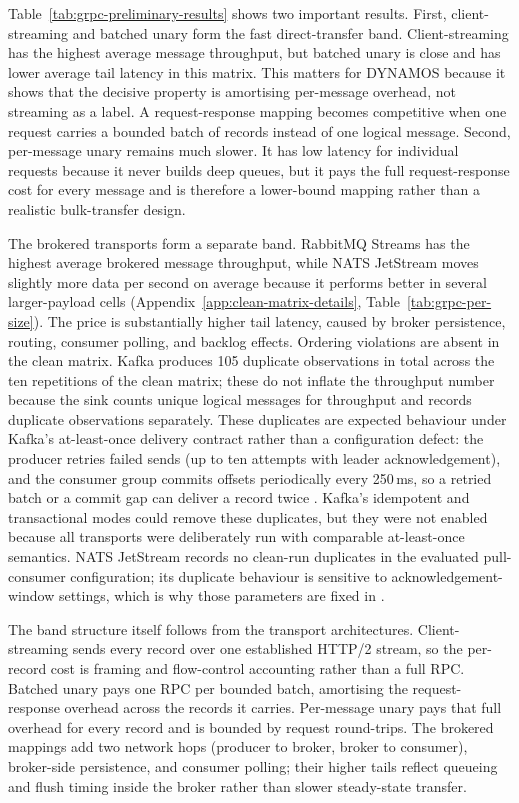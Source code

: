 Table~\ref{tab:grpc-preliminary-results} shows two important results. First, client-streaming and batched unary form the fast direct-transfer band. Client-streaming has the highest average message throughput, but batched unary is close and has lower average tail latency in this matrix. This matters for DYNAMOS because it shows that the decisive property is amortising per-message overhead, not streaming as a label. A request-response mapping becomes competitive when one request carries a bounded batch of records instead of one logical message. Second, per-message unary remains much slower. It has low latency for individual requests because it never builds deep queues, but it pays the full request-response cost for every message and is therefore a lower-bound mapping rather than a realistic bulk-transfer design.

The brokered transports form a separate band. RabbitMQ Streams has the highest average brokered message throughput, while NATS JetStream moves slightly more data per second on average because it performs better in several larger-payload cells (Appendix~\ref{app:clean-matrix-details}, Table~\ref{tab:grpc-per-size}). The price is substantially higher tail latency, caused by broker persistence, routing, consumer polling, and backlog effects. Ordering violations are absent in the clean matrix. Kafka produces 105 duplicate observations in total across the ten repetitions of the clean matrix; these do not inflate the throughput number because the sink counts unique logical messages for throughput and records duplicate observations separately. These duplicates are expected behaviour under Kafka's at-least-once delivery contract rather than a configuration defect: the producer retries failed sends (up to ten attempts with leader acknowledgement), and the consumer group commits offsets periodically every 250\,ms, so a retried batch or a commit gap can deliver a record twice \cite{kafka2026official,dobbelaere2017kafkarabbitmq}. Kafka's idempotent and transactional modes could remove these duplicates, but they were not enabled because all transports were deliberately run with comparable at-least-once semantics. NATS JetStream records no clean-run duplicates in the evaluated pull-consumer configuration; its duplicate behaviour is sensitive to acknowledgement-window settings, which is why those parameters are fixed in .

The band structure itself follows from the transport architectures. Client-streaming sends every record over one established HTTP/2 stream, so the per-record cost is framing and flow-control accounting rather than a full RPC. Batched unary pays one RPC per bounded batch, amortising the request-response overhead across the records it carries. Per-message unary pays that full overhead for every record and is bounded by request round-trips. The brokered mappings add two network hops (producer to broker, broker to consumer), broker-side persistence, and consumer polling; their higher tails reflect queueing and flush timing inside the broker rather than slower steady-state transfer.

